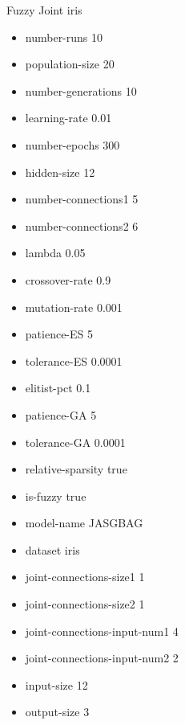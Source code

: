 Fuzzy Joint
iris
\begin{itemize}
\item number-runs 10
\item population-size 20
\item number-generations 10
\item learning-rate 0.01
\item number-epochs 300
\item hidden-size 12
\item number-connections1 5
\item number-connections2 6
\item lambda 0.05
\item crossover-rate 0.9
\item mutation-rate 0.001
\item patience-ES 5
\item tolerance-ES 0.0001
\item elitist-pct 0.1
\item patience-GA 5
\item tolerance-GA 0.0001
\item relative-sparsity true
\item is-fuzzy true
\item model-name JASGBAG
\item dataset iris
\item joint-connections-size1 1
\item joint-connections-size2 1
\item joint-connections-input-num1 4
\item joint-connections-input-num2 2
\item input-size 12
\item output-size 3
\end{itemize}

